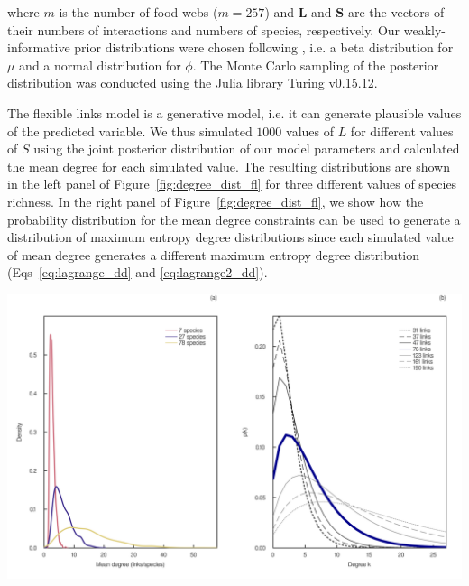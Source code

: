 \begin{box3.1}
where $m$ is the number of food webs ($m = 257$) and $\textbf{L}$ and
$\textbf{S}$ are the vectors of their numbers of interactions and numbers of
species, respectively. Our weakly-informative prior distributions were chosen
following \textcite{MacDonald2020Revisiting}, i.e. a beta distribution for $\mu$ and a
normal distribution for $\phi$. The Monte Carlo sampling of the posterior
distribution was conducted using the Julia library Turing v0.15.12.

The flexible links model is a generative model, i.e. it can generate plausible
values of the predicted variable. We thus simulated $1000$ values of $L$ for
different values of $S$ using the joint posterior distribution of our model
parameters and calculated the mean degree for each
simulated value. The resulting distributions are shown in the left panel of
Figure~\ref{fig:degree_dist_fl} for three different values of species richness. In the
right panel of Figure~\ref{fig:degree_dist_fl}, we show how the probability
distribution for the mean degree constraints can be used to generate a
distribution of maximum entropy degree distributions since each simulated value
of mean degree generates a different maximum entropy degree distribution
(Eqs~\ref{eq:lagrange_dd} and \ref{eq:lagrange2_dd}). 

\clearpage

\includegraphics[width=\textwidth]{figures/article2/maxent_degree_dist_fl.png}
\captionsetup{justification=justified}
\label{fig:degree_dist_fl}


\end{box3.1}
